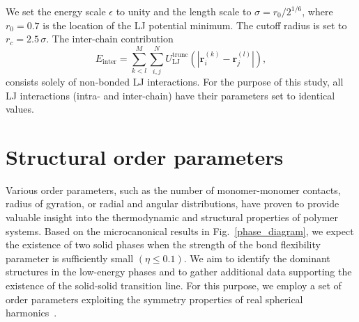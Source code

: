\documentclass[12pt]{report}
\begin{document}
%
We set the energy scale $\epsilon$ to unity and the length scale
to $\sigma=r_0/2^{1/6}$, where $r_0 = 0.7$ is the location of
the LJ potential minimum. The cutoff radius is set to
$r_c=2.5\,\sigma$.
The inter-chain contribution
\begin{equation}
E_{\mathrm{inter}} = \sum^{M}_{k < l}
\sum^{N}_{i,j}U_{\mathrm{LJ}}^{\mathrm{trunc}}(|\textbf{r}^{(k)}_{i}
- \textbf{r}^{(l)}_{j}|),
\end{equation}
%
consists solely of non-bonded LJ interactions. For the purpose
of this study, all LJ interactions (intra- and inter-chain) have
their parameters set to identical values.

\section{Structural order parameters}
Various order parameters, such as the number of monomer-monomer
contacts, radius of gyration, or radial and angular distributions, have
proven to provide valuable insight into the thermodynamic and structural
properties of polymer systems. Based on the microcanonical results in
Fig.~\ref{phase_diagram}, we expect the existence of two solid phases
when the strength of the bond flexibility parameter is sufficiently small
$(\eta \leq 0.1)$. We aim to identify the dominant structures in the
low-energy phases and to gather additional data supporting the existence of
the
solid-solid transition line. For this purpose, we employ a set of order
parameters exploiting the symmetry properties of real spherical
harmonics~\cite{Neirotti2000}.
\end{document}
